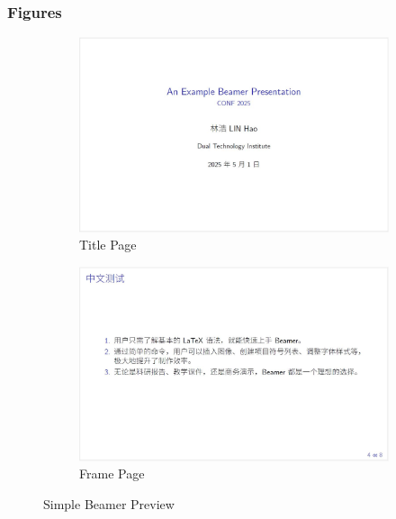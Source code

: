\documentclass{cls/simplebeamer}
\begin{document}
\begin{frame}
  \frametitle{Figures}
  \begin{figure}
    \centering
    \begin{subfigure}[b]{0.45\textwidth}
        \centering
        \includegraphics[width=\textwidth]{previews/simplebeamer1.jpg} %
        \caption{Title Page}
        \label{fig:image1}
    \end{subfigure}
    \hfill
    \begin{subfigure}[b]{0.45\textwidth}
        \centering
        \includegraphics[width=\textwidth]{previews/simplebeamer2.jpg} %
        \caption{Frame Page}
        \label{fig:image2}
    \end{subfigure}
    \caption{Simple Beamer Preview}
    \label{fig:two_images}
  \end{figure}
\end{frame}
\end{document}
